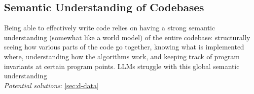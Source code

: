 


\subsection{Semantic Understanding of Codebases} \label{sec:c-global-understanding}

\begin{tcolorbox}[colback=lightgreen, boxrule=0pt, arc=5pt, outer arc=5pt, after skip=10pt plus 2pt]
Being able to effectively write code relies on having a strong semantic understanding (somewhat like a world model) of the entire codebase: structurally seeing how various parts of the code go together, knowing what is implemented where, understanding how the algorithms work, and keeping track of program invariants at certain program points. LLMs struggle with this global semantic understanding
\newline \\
\textit{Potential solutions}: \ref{sec:d-data}
\end{tcolorbox}

